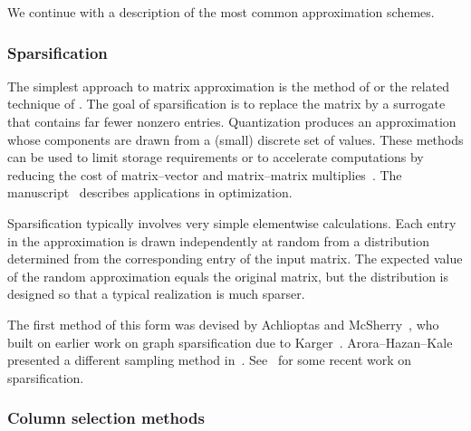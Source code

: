 \documentclass[final]{siamltex}
\begin{document}
\noindent
We continue with a description of the most common approximation schemes.


\subsubsection{Sparsification}

The simplest approach to matrix approximation is the method of
 or the related technique of .
The goal of sparsification is to replace the matrix by a surrogate that contains
far fewer nonzero entries.  Quantization produces an approximation
whose components are drawn from a (small) discrete set of values.  These
methods can be used to limit storage requirements or to accelerate computations
by reducing the cost of matrix--vector
and matrix--matrix multiplies~\cite[Ch.~6]{McS04:Spectral-Methods}.
The manuscript~\cite{Asp09:Subsampling-Algorithms} describes applications in
optimization.

Sparsification typically involves very simple elementwise calculations.  Each
entry in the approximation is drawn independently at random from a distribution
determined from the corresponding entry of the input matrix.  The expected
value of the random approximation equals the original matrix, but the distribution
is designed so that a typical realization is much sparser.

The first method of this form was devised by Achlioptas and
McSherry~\cite{achlioptas_mcsherry}, who built on earlier work on
graph sparsification due to
Karger~\cite{Kar99:Random-Sampling,Kar00:Minimum-Cuts}.
Arora--Hazan--Kale presented a different sampling method
in~\cite{AHK06:Fast-Random}.
See~\cite{SS08:Graph-Sparsification,GT09:Error-Bounds} for some
recent work on sparsification.


\subsubsection{Column selection methods}
\end{document}
